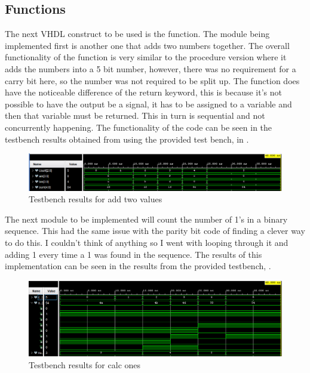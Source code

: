 \documentclass[a4paper, 12pt]{article}
\begin{document}
		\subsection{Functions}
			The next VHDL construct to be used is the function. The module being implemented first is another one that adds two numbers together. The overall functionality of the function is very similar to the procedure version where it adds the numbers into a 5 bit number, however, there was no requirement for a carry bit here, so the number was not required to be split up. The function does have the noticeable difference of the return keyword, this is because it's not possible to have the output be a signal, it has to be assigned to a variable and then that variable must be returned. This in turn is sequential and not concurrently happening. The functionality of the code can be seen in the testbench results obtained from using the provided test bench, in .
			\begin{figure}[!ht]
				\centering
				\includegraphics[width=0.9\columnwidth]{lab321.PNG}
				\caption{Testbench results for add two values}
				\label{fig:321}
			\end{figure}
			\par
			The next module to be implemented will count the number of 1's in a binary sequence. This had the same issue with the parity bit code of finding a clever way to do this. I couldn't think of anything so I went with looping through it and adding 1 every time a 1 was found in the sequence. The results of this implementation can be seen in the results from the provided testbench, .

			\begin{figure}[!ht]
				\centering
				\includegraphics[width=0.9\columnwidth]{lab322.PNG}
				\caption{Testbench results for calc ones}
				\label{fig:322}
			\end{figure}
\end{document}

